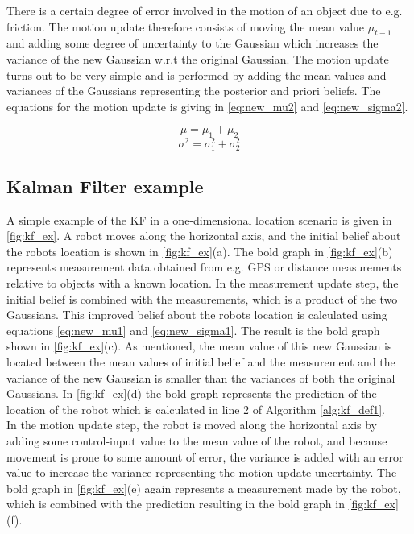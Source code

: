 There is a certain degree of error involved in the motion of an object due to e.g. friction. The motion update therefore consists of moving the mean value $\mu_{t-1}$ and adding some degree of uncertainty to the Gaussian which increases the variance of the new Gaussian w.r.t the original Gaussian. The motion update turns out to be very simple and is performed by adding the mean values and variances of the Gaussians representing the posterior and priori beliefs. The equations for the motion update is giving in \ref{eq:new_mu2} and \ref{eq:new_sigma2}.

\begin{equation}
\label{eq:new_mu2}
\mu = \mu_{1} + \mu_{2}
\end{equation}
\begin{equation}
\label{eq:new_sigma2}
\sigma^2 = \sigma_{1}^2 + \sigma_{2}^2
\end{equation}

\subsection{Kalman Filter example}

A simple example of the KF in a one-dimensional location scenario is given in \autoref{fig:kf_ex}. A robot moves along the horizontal axis, and the initial belief about the robots location is shown in \autoref{fig:kf_ex}(a). The bold graph in \autoref{fig:kf_ex}(b) represents measurement data obtained from e.g. GPS or distance measurements relative to objects with a known location. In the measurement update step, the initial belief is combined with the measurements, which is a product of the two Gaussians. This improved belief about the robots location is calculated using equations \ref{eq:new_mu1} and \ref{eq:new_sigma1}. The result is the bold graph shown in \autoref{fig:kf_ex}(c). As mentioned, the mean value of this new Gaussian is located between the mean values of initial belief and the measurement and the variance of the new Gaussian is smaller than the variances of both the original Gaussians. In \autoref{fig:kf_ex}(d) the bold graph represents the prediction of the location of the robot which is calculated in line 2 of Algorithm \autoref{alg:kf_def1}. \\

In the motion update step, the robot is moved along the horizontal axis by adding some control-input value to the mean value of the robot, and because movement is prone to some amount of error, the variance is added with an error value to increase the variance representing the motion update uncertainty. The bold graph in \autoref{fig:kf_ex}(e) again represents a measurement made by the robot, which is combined with the prediction resulting in the bold graph in \autoref{fig:kf_ex}(f).


